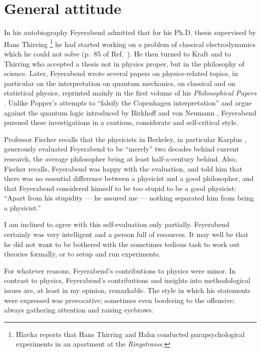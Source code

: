 \documentclass{article}
\begin{document}
\section{General attitude}

In his autobiography Feyerabend admitted
that  for his Ph.D. thesis supervised by Hans Thirring \footnote{
Hlavka reports that Hans Thirring and Hahn conducted parapsychological
experiments in an apartment at the {\em Ringstrasse}.}
he had started working on a problem of classical electrodynamics
which he could not solve (p.~85 of Ref.~\cite{feyerabend-auto}).
He then turned to Kraft and to Thirring who accepted a thesis not in physics proper,
but in the philosophy of science.
Later, Feyerabend wrote several papers
\cite{Oberheim-97,Oberheim-99}
on physics-related topics, in particular on the interpretation on quantum mechanics,
on classical  and  on statistical physics, reprinted
mainly in the first volume of his {\em Philosophical Papers} \cite{fey-philpapers1,fey-philpapers2,fey-philpapers3}.
Unlike Popper's attempts to ``falsify the Copenhagen interpretation''
\cite{2002-peres} and argue against the quantum logic introduced by Birkhoff and von Neumann
\cite{dalla-2002},
Feyerabend pursued these investigations in a cautious, considerate and  self-critical style.

Professor Fischer recalls \cite{fischer} that the physicists in Berkeley,
in particular Karplus \cite{fischer-04},
generously evaluated Feyerabend to be ``merely'' two decades behind current research,
the average philosopher being at least half-a-century behind.
Also, Fischer recalls, Feyerabend was happy with the evaluation, and told him
that there was no essential difference between a physicist and a good philosopher,
and that Feyerabend considered himself to be too stupid to be
a good physicist: { ``Apart from his stupidity --- he assured me --- nothing separated him from
being a physicist.''}

I am inclined to agree with this self-evaluation only partially.
Feyerabend certainly was very intelligent and a person full of resources.
It may well be that he did not want to be bothered with the sometimes tedious
task to work out theories formally, or to setup and run experiments.

For whatever reasons, Feyerabend's contributions to physics were minor.
In contrast to physics, Feyerabend's contributions and insights into methodological issues are,
at least in my opinion,  remarkable.
The style in which his statements were expressed was provocative;
sometimes even bordering to the offensive; always gathering attention and raising eyebrows.
\end{document}
